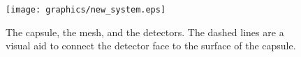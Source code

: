 \begin{figure}
   \centering
   \texttt{[image: graphics/new\_system.eps]}  
   \caption{The capsule, the mesh, and the detectors. The dashed lines are a visual aid to connect the detector face to the surface of the capsule.}
   \label{fig:measurement system}
\end{figure}

\endinput  %
